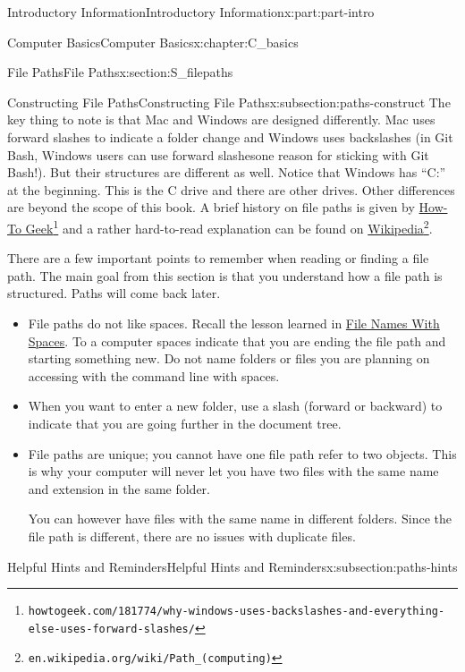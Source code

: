 \documentclass[oneside,10pt,]{book}
\begin{document}
\begin{partptx}{Introductory Information}{}{Introductory Information}{}{}{x:part:part-intro}
\begin{chapterptx}{Computer Basics}{}{Computer Basics}{}{}{x:chapter:C_basics}
\begin{sectionptx}{File Paths}{}{File Paths}{}{}{x:section:S_filepaths}
\begin{subsectionptx}{Constructing File Paths}{}{Constructing File Paths}{}{}{x:subsection:paths-construct}
The key thing to note is that Mac and Windows are designed differently. Mac uses forward slashes to indicate a folder change and Windows uses backslashes (in Git Bash, Windows users can use forward slashes\textellipsis{}one reason for sticking with Git Bash!). But their structures are different as well. Notice that Windows has ``C:'' at the beginning. This is the C drive and there are other drives. Other differences are beyond the scope of this book. A brief history on file paths is given by \href{https://www.howtogeek.com/181774/why-windows-uses-backslashes-and-everything-else-uses-forward-slashes/}{How-To Geek}\footnote{\nolinkurl{howtogeek.com/181774/why-windows-uses-backslashes-and-everything-else-uses-forward-slashes/}\label{g:fn:idp615353880}} and a rather hard-to-read explanation can be found on \href{https://en.wikipedia.org/wiki/Path_(computing)}{Wikipedia}\footnote{\nolinkurl{en.wikipedia.org/wiki/Path_(computing)}\label{g:fn:idp615353112}}.%
\par
There are a few important points to remember when reading or finding a file path. The main goal from this section is that you understand how a file path is structured. Paths will come back later.%
\begin{itemize}[label=\textbullet]
\item{}File paths do not like spaces. Recall the lesson learned in \hyperlink{x:paragraphs:namesspaces}{File Names With Spaces}. To a computer spaces indicate that you are ending the file path and starting something new. Do not name folders or files you are planning on accessing with the command line with spaces.%
\item{}When you want to enter a new folder, use a slash (forward or backward) to indicate that you are going further in the document tree.%
\item{}File paths are unique; you cannot have one file path refer to two objects. This is why your computer will never let you have two files with the same name and extension in the same folder.%
\par
You can however have files with the same name in different folders. Since the file path is different, there are no issues with duplicate files.%
\end{itemize}
%
\end{subsectionptx}
%
%
\typeout{************************************************}
\typeout{************************************************}
%
\begin{subsectionptx}{Helpful Hints and Reminders}{}{Helpful Hints and Reminders}{}{}{x:subsection:paths-hints}

\end{subsectionptx}
\end{sectionptx}
\end{chapterptx}
\end{partptx}
\end{document}
